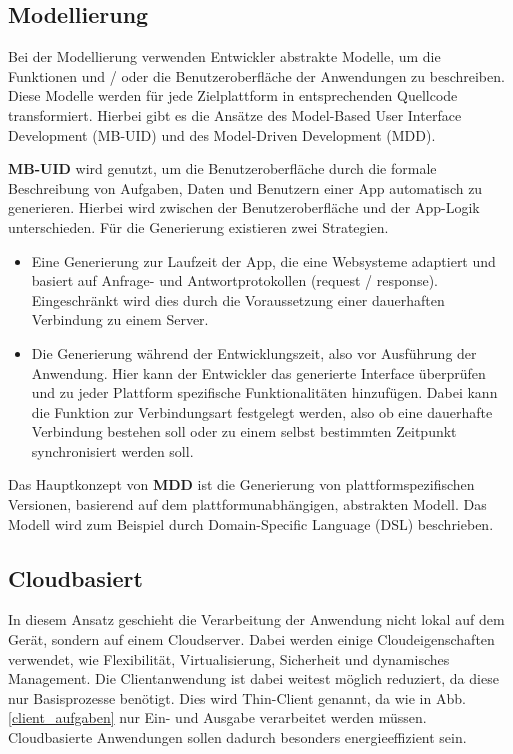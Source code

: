 \subsection{Modellierung}
Bei der Modellierung verwenden Entwickler abstrakte Modelle, um die Funktionen und / oder die Benutzeroberfläche der Anwendungen zu beschreiben. Diese Modelle werden für jede Zielplattform in entsprechenden Quellcode transformiert. Hierbei gibt es die Ansätze des Model-Based User Interface Development (MB-UID) und des Model-Driven Development (MDD).

\medskip
\textbf{MB-UID} wird genutzt, um die Benutzeroberfläche durch die formale Beschreibung von Aufgaben, Daten und Benutzern einer App automatisch zu generieren. Hierbei wird zwischen der Benutzeroberfläche und der App-Logik unterschieden.
Für die Generierung existieren zwei Strategien.

\begin{itemize}
	\item Eine Generierung zur Laufzeit der App, die eine Websysteme adaptiert und basiert auf Anfrage- und Antwortprotokollen (request / response). Eingeschränkt wird dies durch die Voraussetzung einer dauerhaften Verbindung zu einem Server.
	
	\item Die Generierung während der Entwicklungszeit, also vor Ausführung der Anwendung. Hier kann der Entwickler das generierte Interface überprüfen und zu jeder Plattform spezifische Funktionalitäten hinzufügen. Dabei kann die Funktion zur Verbindungsart festgelegt werden, also ob eine dauerhafte Verbindung bestehen soll oder zu einem selbst bestimmten Zeitpunkt synchronisiert werden soll.
\end{itemize}

\medskip
Das Hauptkonzept von \textbf{MDD} ist die Generierung von plattformspezifischen Versionen, basierend auf dem plattformunabhängigen, abstrakten Modell. Das Modell wird zum Beispiel durch Domain-Specific Language (DSL) beschrieben.

\subsection{Cloudbasiert}
In diesem Ansatz geschieht die Verarbeitung der Anwendung nicht lokal auf dem Gerät, sondern auf einem Cloudserver. Dabei werden einige Cloudeigenschaften verwendet, wie Flexibilität, Virtualisierung, Sicherheit und dynamisches Management. Die Clientanwendung ist dabei weitest möglich reduziert, da diese nur Basisprozesse benötigt. Dies wird Thin-Client genannt, da wie in Abb. \ref{client_aufgaben} nur Ein- und Ausgabe verarbeitet werden müssen. Cloudbasierte Anwendungen sollen dadurch besonders energieeffizient sein.

